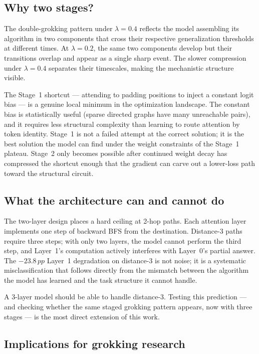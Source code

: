 \documentclass[11pt, a4paper]{article}
\newcommand{\pp}{\,pp}  %
\begin{document}
\subsection{Why two stages?}

The double-grokking pattern under $\lambda = 0.4$ reflects the model
assembling its algorithm in two components that cross their respective
generalization thresholds at different times.  At $\lambda = 0.2$, the
same two components develop but their transitions overlap and appear as
a single sharp event.  The slower compression under $\lambda = 0.4$
separates their timescales, making the mechanistic structure visible.

The Stage~1 shortcut --- attending to padding positions to inject a
constant logit bias --- is a genuine local minimum in the optimization
landscape.  The constant bias is statistically useful (sparse directed
graphs have many unreachable pairs), and it requires less structural
complexity than learning to route attention by token identity.  Stage~1
is not a failed attempt at the correct solution; it is the best
solution the model can find under the weight constraints of the
Stage~1 plateau.  Stage~2 only becomes possible after continued weight
decay has compressed the shortcut enough that the gradient can carve
out a lower-loss path toward the structural circuit.

\subsection{What the architecture can and cannot do}

The two-layer design places a hard ceiling at 2-hop paths.  Each
attention layer implements one step of backward BFS from the
destination.  Distance-3 paths require three steps; with only two
layers, the model cannot perform the third step, and Layer~1's
computation actively interferes with Layer~0's partial answer.
The $-23.8\pp$ Layer~1 degradation on distance-3 is not noise; it is a
systematic misclassification that follows directly from the mismatch
between the algorithm the model has learned and the task structure it
cannot handle.

A 3-layer model should be able to handle distance-3.  Testing this
prediction --- and checking whether the same staged grokking pattern
appears, now with three stages --- is the most direct extension of this
work.

\subsection{Implications for grokking research}
\end{document}
